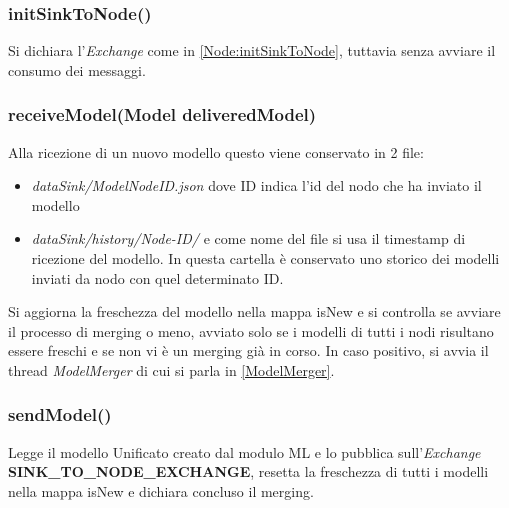       \subsubsection{initSinkToNode()}
        Si dichiara l'\textit{Exchange} come in \ref{Node:initSinkToNode}, tuttavia senza avviare il consumo dei messaggi.
        

      \subsubsection{receiveModel(Model deliveredModel)}
        Alla ricezione di un nuovo modello questo viene conservato in 2 file:
        \begin{itemize}
          \item \textit{dataSink/ModelNodeID.json} dove ID indica l'id del nodo che ha inviato il modello
          \item \textit{dataSink/history/Node-ID/} e come nome del file si usa il timestamp di ricezione del modello. In questa cartella è conservato uno storico dei modelli inviati da nodo con quel determinato ID.
        \end{itemize}
        Si aggiorna la freschezza del modello nella mappa isNew e si controlla se avviare il processo di merging o meno, avviato solo se i modelli di tutti i nodi risultano essere freschi e se non vi è un merging già in corso. In caso positivo, si avvia il thread \textit{ModelMerger} di cui si parla in \ref{ModelMerger}.
        

      \subsubsection{sendModel()}
        Legge il modello Unificato creato dal modulo ML e lo pubblica sull'\textit{Exchange} \textbf{SINK\_TO\_NODE\_EXCHANGE}, resetta la freschezza di tutti i modelli nella mappa isNew e dichiara concluso il merging.
        

